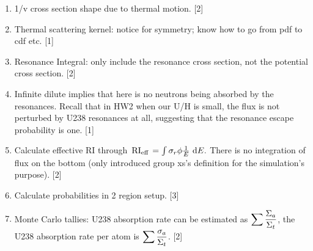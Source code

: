 \documentclass{school-22.211-notes}
\begin{document}
\begin{enumerate}
\item 1/v cross section shape due to thermal motion. [2]
\item Thermal scattering kernel: notice for symmetry; know how to go from pdf to cdf etc. [1]
\item Resonance Integral: only include the resonance cross section, not the potential cross section. [2]
\item Infinite dilute implies that here is no neutrons being absorbed by the resonances. Recall that in HW2 when our U/H is small, the flux is not perturbed by U238 resonances at all, suggesting that the resonance escape probability is one. [1]
\item Calculate effective RI through $\left. \mathrm{RI}_{\mathrm{eff}} \right. = \int \sigma_r \phi \frac{1}{E} \mbox{ }\mathrm{d} E.$ There is no integration of flux on the bottom (only introduced group xs's definition for the simulation's purpose). [2]
\item Calculate probabilities in 2 region setup. [3]
\item Monte Carlo tallies: U238 absorption rate can be estimated as $\displaystyle\sum \frac{\Sigma_a}{\Sigma_t}$, the U238 absorption rate per atom is $\displaystyle\sum \frac{\sigma_a}{\Sigma_t}$. [2]
\end{enumerate}
\end{document}
